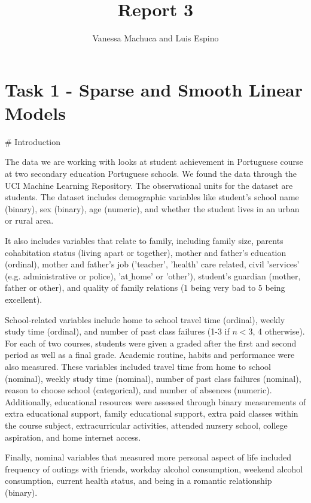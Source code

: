 \documentclass{article}
\title{Report 3}
\author{Vanessa Machuca and Luis Espino}
\begin{document}

\maketitle





\section{Task 1 - Sparse and Smooth Linear Models}

# Introduction 

The data we are working with looks at student achievement in Portuguese course at two secondary education Portuguese schools. We found the data through the UCI Machine Learning Repository. The observational units for the dataset are students. The dataset includes demographic variables like student’s school name (binary), sex (binary), age (numeric), and whether the student lives in an urban or rural area. 

It also includes variables that relate to family, including family size, parents cohabitation status (living apart or together), mother and father's education (ordinal), mother and father’s job ('teacher', 'health' care related, civil 'services' (e.g. administrative or police), 'at$\_$home' or 'other'), student’s guardian (mother, father or other), and quality of family relations ($1$ being very bad to $5$ being excellent). 

School-related variables include home to school travel time (ordinal), weekly study time (ordinal), and number of past class failures (1-3 if $n<3$, 4 otherwise). For each of two courses, students were given a graded after the first and second period as well as a final grade.  
Academic routine, habits and performance were also measured. These variables included travel time from home to school (nominal), weekly study time (nominal), number of past class failures (nominal), reason to choose school (categorical), and number of absences (numeric). Additionally, educational resources were assessed through binary measurements of extra educational support, family educational support, extra paid classes within the course subject, extracurricular activities, attended nursery school, college aspiration, and home internet access.

Finally, nominal variables that measured more personal aspect of life included frequency of outings with friends, workday alcohol consumption, weekend alcohol consumption, current health status, and being in a romantic relationship (binary). 
\end{document}
